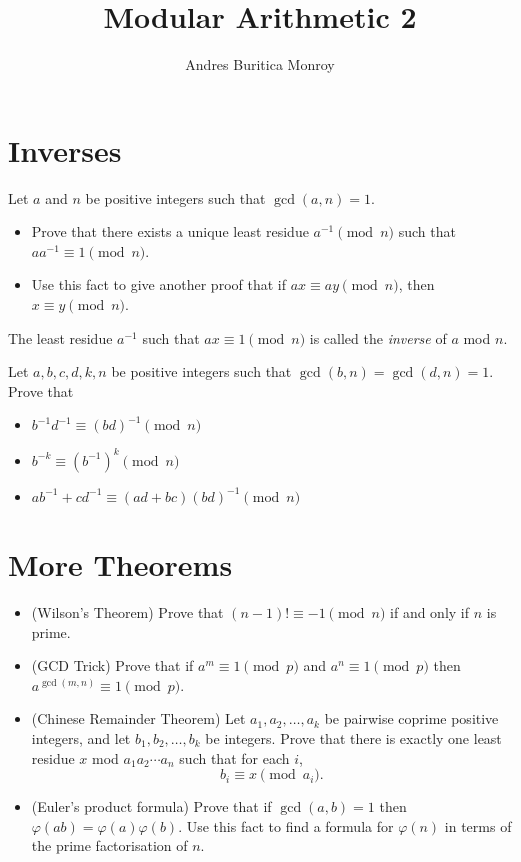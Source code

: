 \documentclass{article}
\title{Modular Arithmetic 2}
\author{Andres Buritica Monroy}
\date{}
\begin{document}
\maketitle
\section{Inverses}
  Let $a$ and $n$ be positive integers such that $\gcd(a,n)=1$.
  \begin{itemize}
    \item Prove that there exists a unique least residue $a^{-1}\pmod n$ such that
      $aa^{-1}\equiv 1\pmod n$.
    \item Use this fact to give another proof that if $ax\equiv ay\pmod n$, then
      $x\equiv y\pmod n$.
  \end{itemize}
  The least residue $a^{-1}$ such that $ax\equiv 1\pmod n$ is called the \emph{inverse} of
  $a$ mod $n$.

  Let $a,b,c,d,k,n$ be positive integers such that
      $\gcd(b,n)=\gcd(d,n)=1$. Prove that
  \begin{itemize}
    \item $b^{-1}d^{-1}\equiv (bd)^{-1}\pmod n$
    \item $b^{-k}\equiv (b^{-1})^k\pmod n$
    \item $ab^{-1}+cd^{-1}\equiv (ad+bc)(bd)^{-1}\pmod n$
  \end{itemize}
\section{More Theorems}
\begin{itemize}
  \item (Wilson's Theorem) Prove that $(n-1)!\equiv -1\pmod n$ if and only if $n$ is prime.
  \item (GCD Trick) Prove that if $a^m\equiv 1\pmod p$ and $a^n\equiv 1\pmod p$ then
    $a^{\gcd(m,n)}\equiv 1\pmod p$.
  \item (Chinese Remainder Theorem) Let $a_1,a_2,\ldots,a_k$ be pairwise coprime positive integers, and let
    $b_1,b_2,\ldots,b_k$ be integers. Prove that there is exactly one least
    residue $x$ mod $a_1a_2\cdots a_n$ such that for each $i$,
    \[b_i\equiv x\pmod {a_i}.\]
  \item (Euler's product formula) Prove that if $\gcd(a,b)=1$ then $\varphi(ab)=\varphi(a)\varphi(b)$. Use
    this fact to find a formula for $\varphi(n)$ in terms of the prime
    factorisation of $n$.
\end{itemize}
\end{document}
